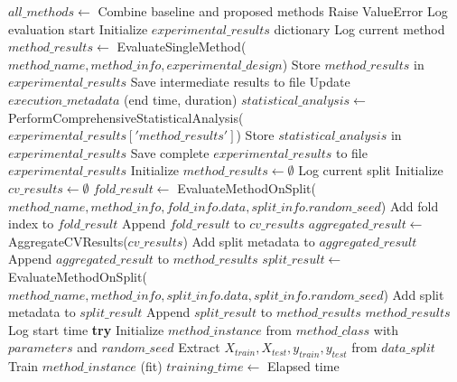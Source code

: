 \begin{algorithm}[!htbp]
\begin{algorithmic}[1]
    \State $all\_methods \leftarrow$ Combine baseline and proposed methods
     \State Raise ValueError \EndIf
    \State Log evaluation start
    \State Initialize $experimental\_results$ dictionary
        \State Log current method
        \State $method\_results \leftarrow$ EvaluateSingleMethod($method\_name, method\_info, experimental\_design$)
        \State Store $method\_results$ in $experimental\_results$
        \State Save intermediate results to file
    \EndFor
    \State Update $execution\_metadata$ (end time, duration)
    \State $statistical\_analysis \leftarrow$ PerformComprehensiveStatisticalAnalysis($experimental\_results['method\_results']$)
    \State Store $statistical\_analysis$ in $experimental\_results$
    \State Save complete $experimental\_results$ to file
    \Return $experimental\_results$
\EndProcedure
\Statex
{}
    \State Initialize $method\_results \leftarrow \emptyset$
        \State Log current split
            \State Initialize $cv\_results \leftarrow \emptyset$
                \State $fold\_result \leftarrow$ EvaluateMethodOnSplit($method\_name, method\_info, fold\_info.data, split\_info.random\_seed$)
                \State Add fold index to $fold\_result$
                \State Append $fold\_result$ to $cv\_results$
            \EndFor
            \State $aggregated\_result \leftarrow$ AggregateCVResults($cv\_results$)
            \State Add split metadata to $aggregated\_result$
            \State Append $aggregated\_result$ to $method\_results$
        \Else {}
            \State $split\_result \leftarrow$ EvaluateMethodOnSplit($method\_name, method\_info, split\_info.data, split\_info.random\_seed$)
            \State Add split metadata to $split\_result$
            \State Append $split\_result$ to $method\_results$
        \EndIf
    \EndFor
    \Return $method\_results$
\EndProcedure
\Statex
{}
    \State Log start time
    \State \textbf{try}
        \State Initialize $method\_instance$ from $method\_class$ with $parameters$ and $random\_seed$
        \State Extract $X_{train}, X_{test}, y_{train}, y_{test}$ from $data\_split$
        \State Train $method\_instance$ (fit)
        \State $training\_time \leftarrow$ Elapsed time

\end{algorithmic}
\end{algorithm}

